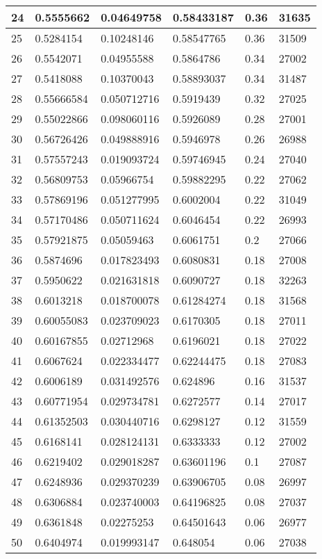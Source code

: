\begin{longtable}{|l|l|l|l|l|l|}
24 & 0.5555662 & 0.04649758 & 0.58433187 & 0.36 & 31635 \\ \hline 
25 & 0.5284154 & 0.10248146 & 0.58547765 & 0.36 & 31509 \\ \hline 
26 & 0.5542071 & 0.04955588 & 0.5864786 & 0.34 & 27002 \\ \hline 
27 & 0.5418088 & 0.10370043 & 0.58893037 & 0.34 & 31487 \\ \hline 
28 & 0.55666584 & 0.050712716 & 0.5919439 & 0.32 & 27025 \\ \hline 
29 & 0.55022866 & 0.098060116 & 0.5926089 & 0.28 & 27001 \\ \hline 
30 & 0.56726426 & 0.049888916 & 0.5946978 & 0.26 & 26988 \\ \hline 
31 & 0.57557243 & 0.019093724 & 0.59746945 & 0.24 & 27040 \\ \hline 
32 & 0.56809753 & 0.05966754 & 0.59882295 & 0.22 & 27062 \\ \hline 
33 & 0.57869196 & 0.051277995 & 0.6002004 & 0.22 & 31049 \\ \hline 
34 & 0.57170486 & 0.050711624 & 0.6046454 & 0.22 & 26993 \\ \hline 
35 & 0.57921875 & 0.05059463 & 0.6061751 & 0.2 & 27066 \\ \hline 
36 & 0.5874696 & 0.017823493 & 0.6080831 & 0.18 & 27008 \\ \hline 
37 & 0.5950622 & 0.021631818 & 0.6090727 & 0.18 & 32263 \\ \hline 
38 & 0.6013218 & 0.018700078 & 0.61284274 & 0.18 & 31568 \\ \hline 
39 & 0.60055083 & 0.023709023 & 0.6170305 & 0.18 & 27011 \\ \hline 
40 & 0.60167855 & 0.02712968 & 0.6196021 & 0.18 & 27022 \\ \hline 
41 & 0.6067624 & 0.022334477 & 0.62244475 & 0.18 & 27083 \\ \hline 
42 & 0.6006189 & 0.031492576 & 0.624896 & 0.16 & 31537 \\ \hline 
43 & 0.60771954 & 0.029734781 & 0.6272577 & 0.14 & 27017 \\ \hline 
44 & 0.61352503 & 0.030440716 & 0.6298127 & 0.12 & 31559 \\ \hline 
45 & 0.6168141 & 0.028124131 & 0.6333333 & 0.12 & 27002 \\ \hline 
46 & 0.6219402 & 0.029018287 & 0.63601196 & 0.1 & 27087 \\ \hline 
47 & 0.6248936 & 0.029370239 & 0.63906705 & 0.08 & 26997 \\ \hline 
48 & 0.6306884 & 0.023740003 & 0.64196825 & 0.08 & 27037 \\ \hline 
49 & 0.6361848 & 0.02275253 & 0.64501643 & 0.06 & 26977 \\ \hline 
50 & 0.6404974 & 0.019993147 & 0.648054 & 0.06 & 27038 \\ \hline 
\end{longtable}